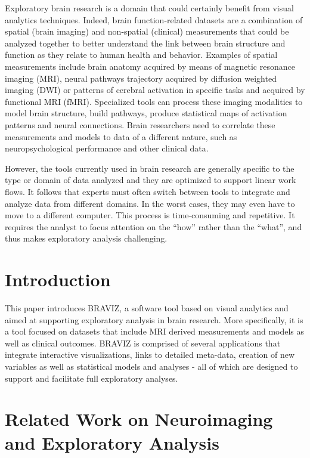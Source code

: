 \documentclass[twocolumn]{svjour3}
\begin{document}
Exploratory brain research is a domain that could certainly benefit from visual analytics techniques. Indeed, brain function-related datasets are a combination of spatial (brain imaging) and non-spatial (clinical) measurements that could be analyzed together to better understand the link between brain structure and function as they relate to human health and behavior. Examples of spatial measurements include brain anatomy acquired by means of magnetic resonance imaging (MRI), neural pathways trajectory acquired by diffusion weighted imaging (DWI) or patterns of cerebral activation in specific tasks and acquired by functional MRI (fMRI). Specialized tools can process these imaging modalities to model brain structure, build pathways, produce statistical maps of activation patterns and neural connections. Brain researchers need to correlate these measurements and models to data of a different nature, such as neuropsychological performance and other clinical data.


However, the tools currently used in brain research are generally specific to the type or domain of data analyzed and they are optimized to support linear work flows. It follows that experts must often switch between tools to integrate and analyze data from different domains. In the worst cases, they may even have to move to a different computer. This process is time-consuming and repetitive. It requires the analyst to focus attention on the ``how'' rather than the ``what'', and thus makes exploratory analysis challenging.
					
\section{Introduction}

This paper introduces BRAVIZ, a software tool based on visual analytics and aimed at supporting exploratory analysis in brain research. More specifically, it is a tool focused on datasets that include MRI derived measurements and models 
as well as clinical outcomes. BRAVIZ is comprised of several applications that integrate interactive visualizations, links to detailed meta-data, creation of new variables as well as statistical models and analyses -  all of which are designed to support and facilitate full exploratory analyses.

\section{Related Work on Neuroimaging and Exploratory Analysis}
\end{document}
